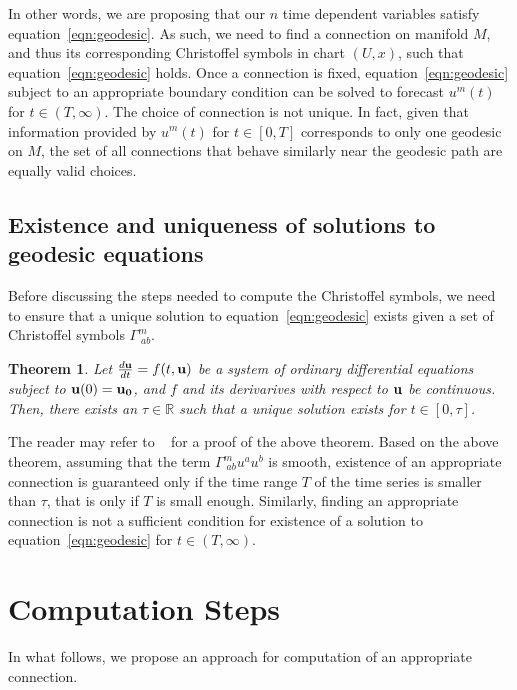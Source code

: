 \documentclass[a4paper,11pt]{elsarticle}
\newtheorem{theorem}{Theorem}
\begin{document}
In other words, we are proposing that our $n$ time dependent variables
satisfy equation~\ref{eqn:geodesic}. As such, we need to find a connection
on manifold $M$, and thus its corresponding Christoffel symbols in
chart $(U,x)$, such that equation~\ref{eqn:geodesic} holds. Once a
connection is fixed, equation~\ref{eqn:geodesic} subject to an
appropriate boundary condition can be solved to forecast $u^{m}(t)$
for $t \in (T, \infty)$. The choice of connection is not unique. In
fact, given that information provided by $u^{m}(t)$ for $t \in [0,T]$
corresponds to only one geodesic on $M$, the set of all connections
that behave similarly near the geodesic path are equally valid
choices.

\subsection{Existence and uniqueness of solutions to geodesic equations}
\label{subsection:existence-geodesic}

Before discussing the steps needed to compute the Christoffel symbols,
we need to ensure that a unique solution to
equation~\ref{eqn:geodesic} exists given a set of Christoffel symbols
$\Gamma^{m}_{\;ab}$.

\begin{theorem}
  Let $\frac{d\bold{u}}{dt} = f(t, \bold{u})$ be a system of ordinary
  differential equations subject to $\bold{u}(0) = \bold{u_{0}}$, and
  $f$ and its derivarives with respect to $\bold{u}$ be
  continuous. Then, there exists an $\tau \in \mathbb{R}$ such that a
  unique solution exists for $t \in [0, \tau]$.
\end{theorem}

The reader may refer to ~\cite{boyes-1990} for a proof of the above
theorem. Based on the above theorem, assuming that the term
$\Gamma^{m}_{\;ab} u^{a} u^{b}$ is smooth, existence of an appropriate
connection is guaranteed only if the time range $T$ of the time series
is smaller than $\tau$, that is only if $T$ is small enough. Similarly,
finding an appropriate connection is not a sufficient condition for
existence of a solution to equation~\ref{eqn:geodesic} for $t \in (T,
\infty)$. 

\section{Computation Steps}
\label{section:computation}

In what follows, we propose an approach for computation of an
appropriate connection.
\end{document}
